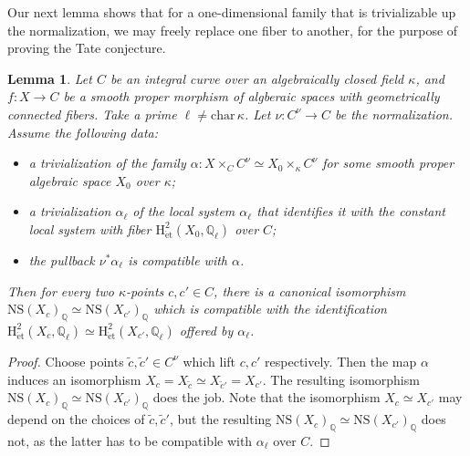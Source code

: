 \documentclass[11pt, letterpaper]{amsart}
\theoremstyle{plain}
\newtheorem{lemma}[theorem]{Lemma}
\theoremstyle{definition}
\newcommand{\IQ}{\mathbb{Q}}
\newcommand{\<}{\langle}
\renewcommand{\>}{\rangle}
\def\wt{\widetilde}
\newcommand{\NS}{\mathrm{NS}}
\newcommand{\et}{\mathrm{{\acute{e}}t}}
\renewcommand{\H}{\mathrm{H}}
\begin{document}
Our next lemma shows that for a one-dimensional family that is trivializable up the normalization, we may freely replace one fiber to another, for the purpose of proving the Tate conjecture.
\begin{lemma}
\label{lem: move points}
    Let $C$ be an integral curve over an algebraically closed field $\kappa$, and $f : X \to C$ be a smooth proper morphism of algberaic spaces with geometrically connected fibers. Take a prime $\ell \neq \mathrm{char\,}\kappa$. Let $\nu : C^\nu \to C$ be the normalization. 
    Assume the following data:
    \begin{itemize}
    	\item a trivialization of the family $\alpha : X \times_C C^\nu \simeq X_0 \times_\kappa C^\nu$ for some smooth proper algebraic space $X_0$ over $\kappa$;
    	\item a trivialization $\alpha_\ell$ of the local system $\alpha_\ell$ that identifies it with the constant local system with fiber $\H^2_\et(X_0, \IQ_\ell)$ over $C$;
    	\item the pullback $\nu^* \alpha_\ell$ is compatible with $\alpha$.
    \end{itemize}
Then for every two $\kappa$-points $c, c' \in C$, there is a canonical isomorphism $\NS(X_c)_\IQ \simeq \NS(X_{c'})_\IQ$ which is compatible with the identification $\H^2_\et(X_c, \IQ_\ell) \simeq \H^2_\et(X_{c'}, \IQ_\ell)$ offered by $\alpha_\ell$. 
\end{lemma}
\begin{proof}
    Choose points $\wt{c}, \wt{c}' \in C^\nu$ which lift $c, c'$ respectively. 
    Then the map $\alpha$ induces an isomorphism $X_c = X_{\wt{c}} \simeq X_{\wt{c}'} = X_{c'}$. 
    The resulting isomorphism $\NS(X_c)_\IQ \simeq \NS(X_{c'})_\IQ$ does the job. Note that the isomorphism $X_c \simeq X_{c'}$ may depend on the choices of $\wt{c}, \wt{c}'$, but the resulting $\NS(X_c)_\IQ \simeq \NS(X_{c'})_\IQ$ does not, as the latter has to be compatible with $\alpha_\ell$ over $C$. 
\end{proof}
\end{document}
